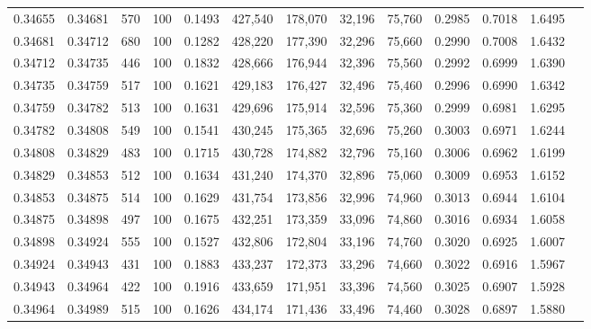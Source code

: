 \begin{tabular}{rrrrrrrrrrrrr}
0.34655 & 0.34681 &    570 & 100 &                                     0.1493 & 427,540 & 178,070 &  32,196 &  75,760 & 0.2985 & 0.7018 & 1.6495 \\
0.34681 & 0.34712 &    680 & 100 &                                     0.1282 & 428,220 & 177,390 &  32,296 &  75,660 & 0.2990 & 0.7008 & 1.6432 \\
0.34712 & 0.34735 &    446 & 100 &                                     0.1832 & 428,666 & 176,944 &  32,396 &  75,560 & 0.2992 & 0.6999 & 1.6390 \\
0.34735 & 0.34759 &    517 & 100 &                                     0.1621 & 429,183 & 176,427 &  32,496 &  75,460 & 0.2996 & 0.6990 & 1.6342 \\
0.34759 & 0.34782 &    513 & 100 &                                     0.1631 & 429,696 & 175,914 &  32,596 &  75,360 & 0.2999 & 0.6981 & 1.6295 \\
0.34782 & 0.34808 &    549 & 100 &                                     0.1541 & 430,245 & 175,365 &  32,696 &  75,260 & 0.3003 & 0.6971 & 1.6244 \\
0.34808 & 0.34829 &    483 & 100 &                                     0.1715 & 430,728 & 174,882 &  32,796 &  75,160 & 0.3006 & 0.6962 & 1.6199 \\
0.34829 & 0.34853 &    512 & 100 &                                     0.1634 & 431,240 & 174,370 &  32,896 &  75,060 & 0.3009 & 0.6953 & 1.6152 \\
0.34853 & 0.34875 &    514 & 100 &                                     0.1629 & 431,754 & 173,856 &  32,996 &  74,960 & 0.3013 & 0.6944 & 1.6104 \\
0.34875 & 0.34898 &    497 & 100 &                                     0.1675 & 432,251 & 173,359 &  33,096 &  74,860 & 0.3016 & 0.6934 & 1.6058 \\
0.34898 & 0.34924 &    555 & 100 &                                     0.1527 & 432,806 & 172,804 &  33,196 &  74,760 & 0.3020 & 0.6925 & 1.6007 \\
0.34924 & 0.34943 &    431 & 100 &                                     0.1883 & 433,237 & 172,373 &  33,296 &  74,660 & 0.3022 & 0.6916 & 1.5967 \\
0.34943 & 0.34964 &    422 & 100 &                                     0.1916 & 433,659 & 171,951 &  33,396 &  74,560 & 0.3025 & 0.6907 & 1.5928 \\
0.34964 & 0.34989 &    515 & 100 &                                     0.1626 & 434,174 & 171,436 &  33,496 &  74,460 & 0.3028 & 0.6897 & 1.5880 \\

\end{tabular}
